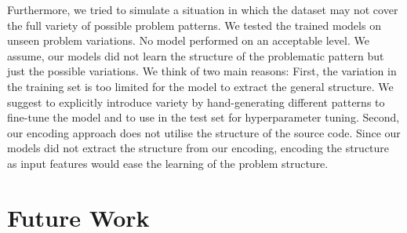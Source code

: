 Furthermore, we tried to simulate a situation in which the dataset may not cover the full variety of possible problem patterns. We tested the trained models on unseen problem variations. No model performed on an acceptable level. We assume, our models did not learn the structure of the problematic pattern but just the possible variations. 
We think of two main reasons: First, the variation in the training set is too limited for the model to extract the general structure. We suggest to explicitly introduce variety by hand-generating different patterns to fine-tune the model and to use in the test set for hyperparameter tuning.
Second, our encoding approach does not utilise the structure of the source code. Since our models did not extract the structure from our encoding, encoding the structure as input features would ease the learning of the problem structure.  

\section{Future Work}

